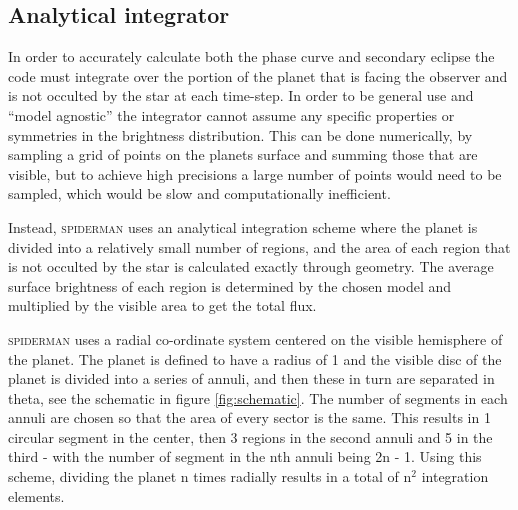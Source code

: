 \documentclass[a4paper,fleqn,usenatbib]{mnras}
\begin{document}
\subsection{Analytical integrator}\label{sec:integrator}

In order to accurately calculate both the phase curve and secondary eclipse the code must integrate over the portion of the planet that is facing the observer and is not occulted by the star at each time-step. In order to be general use and ``model agnostic'' the integrator cannot assume any specific properties or symmetries in the brightness distribution. This can be done numerically, by sampling a grid of points on the planets surface and summing those that are visible, but to achieve high precisions a large number of points would need to be sampled, which would be slow and computationally inefficient.

Instead, \textsc{spiderman} uses an analytical integration scheme where the planet is divided into a relatively small number of regions, and the area of each region that is not occulted by the star is calculated exactly through geometry. The average surface brightness of each region is determined by the chosen model and multiplied by the visible area to get the total flux.

\textsc{spiderman} uses a radial co-ordinate system centered on the visible hemisphere of the planet. The planet is defined to have a radius of 1 and the visible disc of the planet is divided into a series of annuli, and then these in turn are separated in theta, see the schematic in figure \ref{fig:schematic}. The number of segments in each annuli are chosen so that the area of every sector is the same. This results in 1 circular segment in the center, then 3 regions in the second annuli and 5 in the third - with the number of segment in the nth annuli being 2n - 1. Using this scheme, dividing the planet n times radially results in a total of n$^2$ integration elements.
\end{document}
